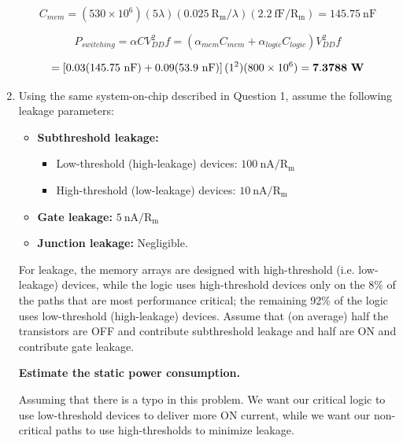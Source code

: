 \documentclass[fleqn]{article}
\begin{document}
\begin{enumerate}
		\begin{equation*}
			C_{mem} = (530 \times 10^6)(5\lambda)(0.025\ \text{R}_\text{m}/\lambda)(2.2\ \text{fF}/\text{R}_\text{m}) = 145.75\ \text{nF}
		\end{equation*}
		
		\begin{equation*}
			P_{switching} = {\alpha}CV_{DD}^2f = ({\alpha_{mem}}C_{mem} + {\alpha_{logic}}C_{logic})V_{DD}^2f
		\end{equation*}
		
		\begin{equation*}
			= \left[0.03(145.75\ \text{nF}) + 0.09(53.9\ \text{nF})\right](1^2)(800 \times 10^6) = \mathbf{7.3788}\ \text{\textbf{W}}
		\end{equation*}
		
		\item Using the same system-on-chip described in Question 1, assume the following leakage parameters:
		
		\begin{itemize}
			\item \textbf{Subthreshold leakage:}
				\begin{itemize}[label={--}]
					\item Low-threshold (high-leakage) devices: $100\ \text{nA}/\text{R}_\text{m}$
					\item High-threshold (low-leakage) devices: $10\ \text{nA}/\text{R}_\text{m}$
				\end{itemize}
			\item \textbf{Gate leakage:} $5\ \text{nA}/\text{R}_\text{m}$
			\item \textbf{Junction leakage:} Negligible.
		\end{itemize}
		
		For leakage, the memory arrays are designed with high-threshold (i.e. low-leakage) devices, while the logic uses high-threshold devices only on the 8\% of the paths that are most performance critical; the remaining 92\% of the logic uses low-threshold (high-leakage) devices. Assume that (on average) half the transistors are OFF and contribute subthreshold leakage and half are ON and contribute gate leakage.

		\textbf{Estimate the static power consumption.}
		
		Assuming that there is a typo in this problem. We want our critical logic to use low-threshold devices to deliver more ON current, while we want our non-critical paths to use high-thresholds to minimize leakage.
		

\end{enumerate}
\end{document}
